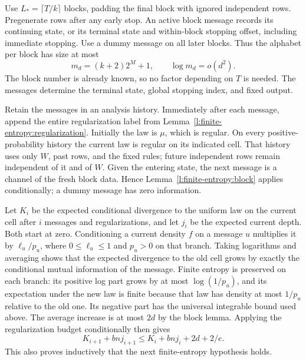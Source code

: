 Use \(L_*=\lceil T/k\rceil\) blocks, padding the final block with
ignored independent rows.  Pregenerate rows after any early stop.
An active block message records its continuing state, or its terminal
state and within-block stopping offset, including immediate stopping.
Use a dummy message on all later blocks.  Thus the alphabet per block
has size at most
\begin{equation}\label{l:finite-entropy:alphabet}
 m_d=(k+2)2^M+1,\qquad \log m_d=o(d^2).
\end{equation}
The block number is already known, so no factor depending on \(T\)
is needed.  The messages determine the terminal state, global stopping
index, and fixed output.

Retain the messages in an analysis history.  Immediately after each
message, append the entire regularization label from
Lemma~\ref{l:finite-entropy:regularization}.  Initially the law is
\(\mu\), which is regular.  On every positive-probability history the
current law is regular on its indicated cell.  That history uses only
\(W\), past rows, and the fixed rules; future independent rows remain
independent of it and of \(W\).  Given the entering state, the next
message is a channel of the fresh block data.  Hence
Lemma~\ref{l:finite-entropy:block} applies conditionally; a dummy
message has zero information.

Let \(K_i\) be the expected conditional divergence to the uniform
law on the current cell after \(i\) messages and regularizations, and
let \(j_i\) be the expected current depth.  Both start at zero.
Conditioning a current density \(f\) on a message \(u\) multiplies
it by \(\ell_u/p_u\), where \(0\le\ell_u\le1\) and \(p_u>0\)
on that branch.  Taking logarithms and averaging shows that the
expected divergence to the old cell grows by exactly the conditional
mutual information of the message.  Finite entropy is preserved on
each branch: its positive log part grows by at most \(\log(1/p_u)\),
and its expectation under the new law is finite because that law has
density at most \(1/p_u\) relative to the old one.  Its negative
part has the universal integrable bound used above.
The average increase is at most \(2d\) by the block lemma.
Applying the regularization budget conditionally then gives
\begin{equation}\label{l:finite-entropy:iteration}
 K_{i+1}+bnj_{i+1}\le K_i+bnj_i+2d+2/e.
\end{equation}
This also proves inductively that the next finite-entropy hypothesis
holds.


